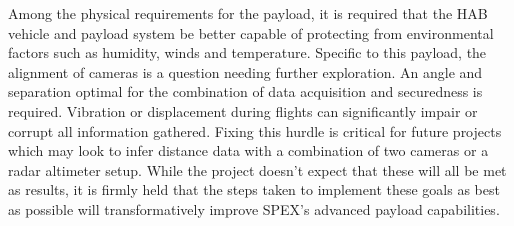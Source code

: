 \documentclass[conference]{IEEEtran} %
\begin{document}
Among the physical requirements for the payload, it is required that the HAB vehicle and payload system be better capable of protecting from environmental factors such as humidity, winds and temperature. Specific to this payload, the alignment of cameras is a question needing further exploration. An angle and separation optimal for the combination of data acquisition and securedness is required. Vibration or displacement during flights can significantly impair or corrupt all information gathered. Fixing this hurdle is critical for future projects which may look to infer distance data with a combination of two cameras or a radar altimeter setup. While the project doesn't expect that these will all be met as results, it is firmly held that the steps taken to implement these goals as best as possible will transformatively improve SPEX's advanced payload capabilities.
\end{document}
